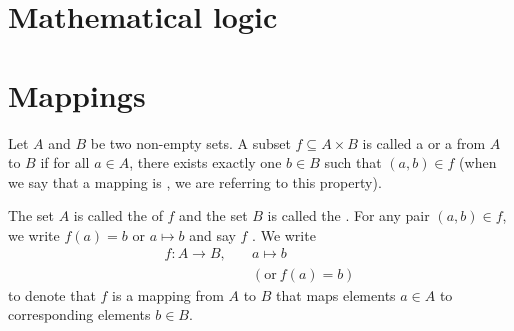 \section{Mathematical logic}

\section{Mappings}



\begin{definition}
Let $ A $ and $ B $ be two non-empty sets. A subset $ f\subseteq A\times B $ is called a  or a  from $ A $ to $ B $ if for all $ a\in A $, there exists exactly one $ b\in B $ such that $ (a,b)\in f $ (when we say that a mapping is , we are referring to this property).

The set $ A $ is called the  of $ f $ and the set $ B $ is called the . For any pair $ (a,b)\in f $, we write $ f(a)=b $ or $ a\mapsto b $ and say $ f $ . We write
\begin{align*}
    f:A\to B,\quad & a\mapsto b \\
    & (\text{or}\ f(a)=b)
\end{align*}
to denote that $ f $ is a mapping from $ A $ to $ B $ that maps elements $ a\in A $ to corresponding elements $ b\in B $.
\end{definition}

